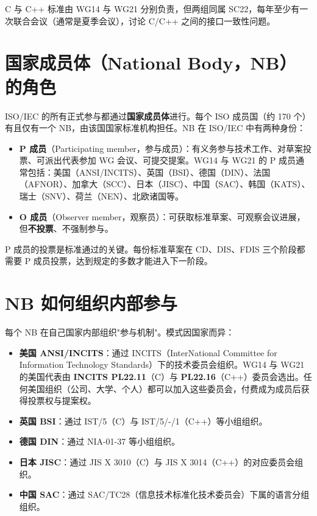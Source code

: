 \documentclass[12pt,a4paper,fontset=fandol]{ctexbook}
\begin{document}
C 与 C++ 标准由 WG14 与 WG21 分别负责，但两组同属 SC22，每年至少有一次联合会议（通常是夏季会议），讨论 C/C++ 之间的接口一致性问题。

\section{国家成员体（National Body，NB）的角色}

ISO/IEC 的所有正式参与都通过\textbf{国家成员体}进行。每个 ISO 成员国（约 170 个）有且仅有一个 NB，由该国国家标准机构担任。NB 在 ISO/IEC 中有两种身份：

\begin{itemize}
  \item \textbf{P 成员}（Participating member，参与成员）：有义务参与技术工作、对草案投票、可派出代表参加 WG 会议、可提交提案。WG14 与 WG21 的 P 成员通常包括：美国（ANSI/INCITS）、英国（BSI）、德国（DIN）、法国（AFNOR）、加拿大（SCC）、日本（JISC）、中国（SAC）、韩国（KATS）、瑞士（SNV）、荷兰（NEN）、北欧诸国等。
  \item \textbf{O 成员}（Observer member，观察员）：可获取标准草案、可观察会议进展，但\textbf{不投票}、不强制参与。
\end{itemize}

P 成员的投票是标准通过的关键。每份标准草案在 CD、DIS、FDIS 三个阶段都需要 P 成员投票，达到规定的多数才能进入下一阶段。

\section{NB 如何组织内部参与}

每个 NB 在自己国家内部组织"参与机制"。模式因国家而异：

\begin{itemize}
  \item \textbf{美国 ANSI/INCITS}：通过 INCITS（InterNational Committee for Information Technology Standards）下的技术委员会组织。WG14 与 WG21 的美国代表由 \textbf{INCITS PL22.11}（C）与 \textbf{PL22.16}（C++）委员会选出。任何美国组织（公司、大学、个人）都可以加入这些委员会，付费成为成员后获得投票权与提案权。
  \item \textbf{英国 BSI}：通过 IST/5（C）与 IST/5/-/1（C++）等小组组织。
  \item \textbf{德国 DIN}：通过 NIA-01-37 等小组组织。
  \item \textbf{日本 JISC}：通过 JIS X 3010（C）与 JIS X 3014（C++）的对应委员会组织。
  \item \textbf{中国 SAC}：通过 SAC/TC28（信息技术标准化技术委员会）下属的语言分组组织。
\end{itemize}
\end{document}
